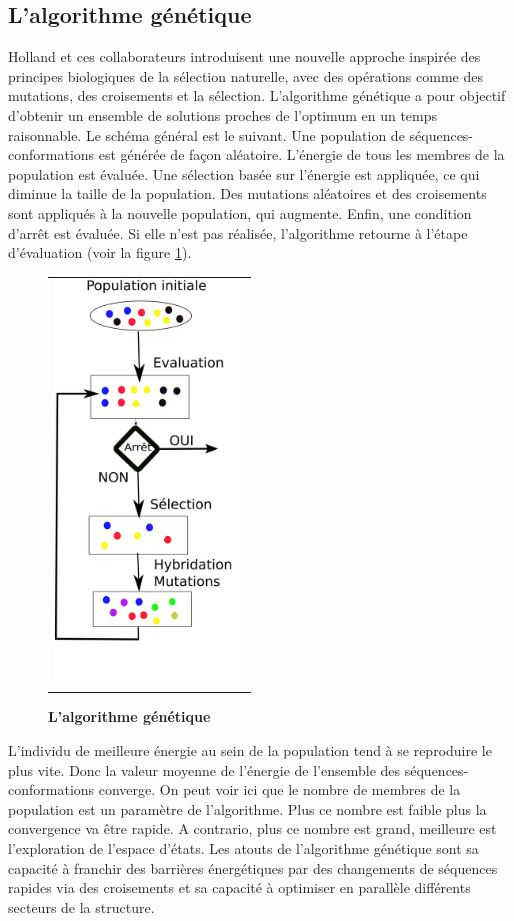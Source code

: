 \subsection{L'algorithme génétique}

Holland et ces collaborateurs \cite{Goldberg88} introduisent une nouvelle approche inspirée des principes biologiques de la sélection naturelle, avec des opérations comme des mutations, des croisements et la sélection. L'algorithme génétique a pour objectif d'obtenir un ensemble de solutions proches de l'optimum en un temps raisonnable.
Le schéma général est le suivant. Une population de séquences-conformations est générée de façon aléatoire. L'énergie de tous les membres de la population est évaluée. Une sélection basée sur l'énergie est appliquée, ce qui diminue la taille de la population. Des mutations aléatoires et des croisements sont appliqués à la nouvelle population, qui augmente. Enfin, une condition d'arrêt est évaluée. Si elle n'est pas réalisée, l'algorithme retourne à l'étape d'évaluation (voir la figure \ref{fig:algo_gene}). 

\begin{figure}[!h]
  \centering
  \begin{tabular}{c}
    \includegraphics[width=5cm]{figure/algo_genetique.png} \\
  \end{tabular}
  \caption{\textbf{L'algorithme génétique}}
  \label{fig:algo_gene}
\end{figure}


L'individu de meilleure énergie au sein de la population tend à se reproduire le plus vite. Donc la valeur moyenne de l'énergie de l'ensemble des séquences-conformations converge. On peut voir ici que le nombre de membres de la population est un paramètre de l'algorithme. Plus ce nombre est faible plus la convergence va être rapide. A contrario, plus ce nombre est grand, meilleure est l'exploration de l'espace d'états. Les atouts de l'algorithme génétique sont sa capacité à franchir des barrières énergétiques par des changements de séquences rapides via des croisements et sa capacité à optimiser en parallèle différents secteurs de la structure.

